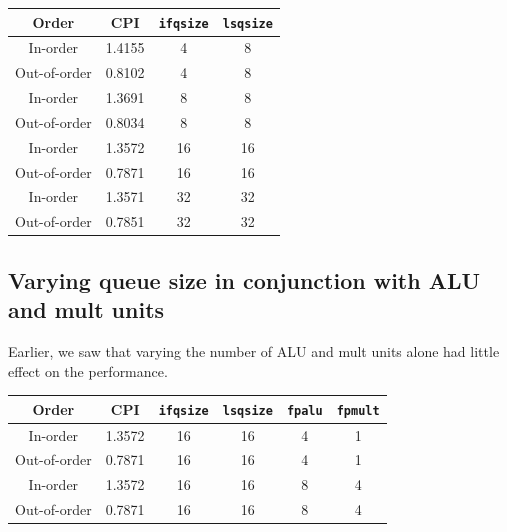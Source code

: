 \documentclass[twocolumn]{article}
\newcommand{\cc}[1]{\texttt{#1}}
\begin{document}
\begingroup
    \medskip
    \centering
    \def\arraystretch{1.5}
        \begin{tabular}{cccc}
            \toprule
            Order & CPI & \cc{ifqsize} & \cc{lsqsize}\\
             \midrule
            In-order & 1.4155 & 4 & 8\\
            Out-of-order & 0.8102 & 4 & 8\\
            \midrule
            In-order & 1.3691 & 8 & 8\\
            Out-of-order & 0.8034 & 8 & 8\\
            \midrule
            In-order & 1.3572 & 16 & 16\\
            Out-of-order & 0.7871 & 16 & 16\\
            \midrule
            In-order & 1.3571 & 32 & 32\\
            Out-of-order & 0.7851 & 32 & 32\\
            \bottomrule
        \end{tabular}
    \label{table:btb}
\endgroup

\subsection{Varying queue size in conjunction with ALU and mult units}

Earlier, we saw that varying the number of ALU and mult units alone had little effect on the performance. \\

\begingroup
    \centering
    \def\arraystretch{1.5}
        \begin{tabular}{cccccc}
            \toprule
            Order & CPI & \cc{ifqsize} & \cc{lsqsize} & \cc{fpalu} & \cc{fpmult}\\
            \midrule
            In-order & 1.3572 & 16 & 16 & 4 & 1\\
            Out-of-order & 0.7871 & 16 & 16 & 4 & 1\\
            \midrule
            In-order & 1.3572 & 16 & 16 & 8 & 4\\
            Out-of-order & 0.7871 & 16 & 16 & 8 & 4\\
            \bottomrule
        \end{tabular}
    \label{table:btb}
\endgroup
\end{document}
